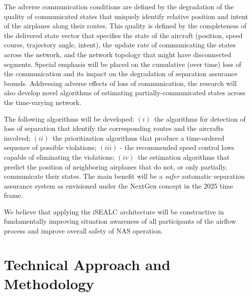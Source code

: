 \documentclass[letter,onecolumn,12pt]{aiaa-tc}
\newcommand{\1}{1_n}
\begin{document}
The adverse communication conditions are defined by the degradation of the quality of communicated states that uniquely identify relative position and intent of the airplanes along their routes. This quality is defined by the completeness of the delivered state vector that specifies the state of the aircraft (position, speed course, trajectory angle, intent), the update rate of communicating the states across the network, and the network topology that might have disconnected segments. Special emphasis will be placed on the cumulative (over time) loss of the communication and its impact on the degradation of separation assurance bounds. Addressing adverse effects of loss of communication, the research will also develop novel algorithms of estimating partially-communicated states across the time-varying network.

The following algorithms will be developed: $(i)$~the algorithms for detection of loss of separation that identify the corresponding routes and the aircrafts involved; $(ii)$~the prioritization algorithms that produce a time-ordered sequence of possible violations; $(iii)$ - the recommended speed control laws capable of eliminating the violations; $(iv)$~the estimation algorithms that predict the position of neighboring airplanes that do not, or only partially, communicate their states. The main benefit will be a \emph{safer} automatic separation assurance system as envisioned under the NextGen concept in the 2025 time frame.

We believe that applying the iSEALC architecture will be constructive in fundamentally improving situation awareness of all participants of the airflow process and improve overall safety of NAS operation.


\section{Technical Approach and Methodology}

\end{document}
